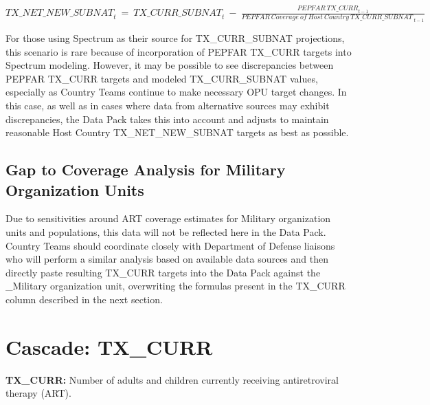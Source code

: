 \documentclass[
  openany]{book}
\begin{document}
\begin{center} ${TX\_ NET\_ NEW\_ SUBNAT}_{t}\  = \ {TX\_ CURR\_ SUBNAT}_{t}\  - \ \frac{{PEPFAR\ TX\_ CURR}_{t - 1}}{{PEPFAR\ Coverage\ of\ Host\ Country\ TX\_ CURR\_ SUBNAT\ }_{t - 1}}$ \end{center}

For those using Spectrum as their source for TX\_CURR\_SUBNAT projections,
this scenario is rare because of incorporation of PEPFAR TX\_CURR targets
into Spectrum modeling. However, it may be possible to see discrepancies
between PEPFAR TX\_CURR targets and modeled TX\_CURR\_SUBNAT values,
especially as Country Teams continue to make necessary OPU target
changes. In this case, as well as in cases where data from alternative
sources may exhibit discrepancies, the Data Pack takes this into account
and adjusts to maintain reasonable Host Country TX\_NET\_NEW\_SUBNAT
targets as best as possible.

\hypertarget{gap-to-coverage-analysis-for-military-organization-units}{%
\subsection{Gap to Coverage Analysis for Military Organization Units}\label{gap-to-coverage-analysis-for-military-organization-units}}

Due to sensitivities around ART coverage estimates for Military
organization units and populations, this data will not be reflected here
in the Data Pack. Country Teams should coordinate closely with
Department of Defense liaisons who will perform a similar analysis based
on available data sources and then directly paste resulting TX\_CURR
targets into the Data Pack against the \_Military organization unit,
overwriting the formulas present in the TX\_CURR column described in the
next section.

\hypertarget{cascade-tx_curr}{%
\section{Cascade: TX\_CURR}\label{cascade-tx_curr}}

\textbf{TX\_CURR:} Number of adults and children currently receiving
antiretroviral therapy (ART).
\end{document}
